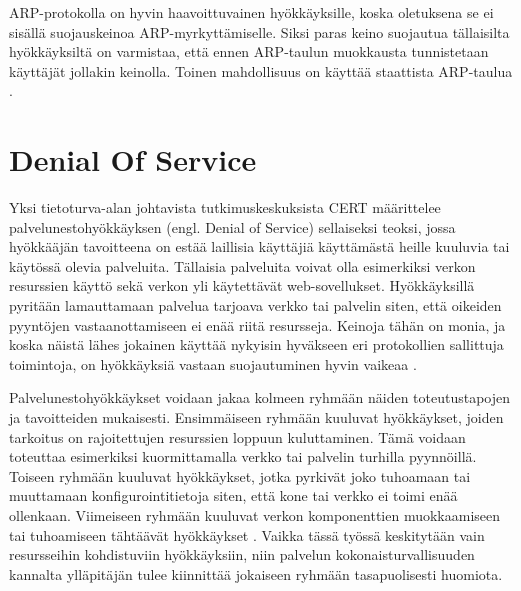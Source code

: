 ARP-protokolla on hyvin haavoittuvainen hyökkäyksille, koska oletuksena se ei
sisällä suojauskeinoa ARP-myrkyttämiselle. Siksi paras keino suojautua
tällaisilta hyökkäyksiltä on varmistaa, että ennen ARP-taulun muokkausta
tunnistetaan käyttäjät jollakin keinolla. Toinen mahdollisuus on käyttää
staattista ARP-taulua \cite{WEBS}.

\section{Denial Of Service}

Yksi tietoturva-alan johtavista tutkimuskeskuksista CERT \cite{CERT}
määrittelee palvelunestohyökkäyksen (engl. Denial of Service)
sellaiseksi teoksi, jossa hyökkääjän tavoitteena on estää laillisia
käyttäjiä käyttämästä heille kuuluvia tai käytössä olevia
palveluita. Tällaisia palveluita voivat olla esimerkiksi verkon
resurssien käyttö sekä verkon yli käytettävät
web-sovellukset. Hyökkäyksillä pyritään lamauttamaan palvelua tarjoava
verkko tai palvelin siten, että oikeiden pyyntöjen vastaanottamiseen
ei enää riitä resursseja. Keinoja tähän on monia, ja koska näistä
lähes jokainen käyttää nykyisin hyväkseen eri protokollien sallittuja
toimintoja, on hyökkäyksiä vastaan suojautuminen hyvin vaikeaa \cite{Hacking}.

Palvelunestohyökkäykset voidaan jakaa kolmeen ryhmään näiden
toteutustapojen ja tavoitteiden mukaisesti. Ensimmäiseen ryhmään kuuluvat
hyökkäykset, joiden tarkoitus on rajoitettujen resurssien loppuun
kuluttaminen. Tämä voidaan toteuttaa esimerkiksi kuormittamalla verkko
tai palvelin turhilla pyynnöillä. Toiseen ryhmään kuuluvat
hyökkäykset, jotka pyrkivät joko tuhoamaan tai muuttamaan
konfigurointitietoja siten, että kone tai verkko ei toimi enää
ollenkaan. Viimeiseen ryhmään kuuluvat verkon komponenttien
muokkaamiseen tai tuhoamiseen tähtäävät hyökkäykset \cite{CERT}. Vaikka tässä
työssä keskitytään vain resursseihin kohdistuviin hyökkäyksiin, niin
palvelun kokonaisturvallisuuden kannalta ylläpitäjän tulee kiinnittää 
jokaiseen ryhmään tasapuolisesti huomiota.

